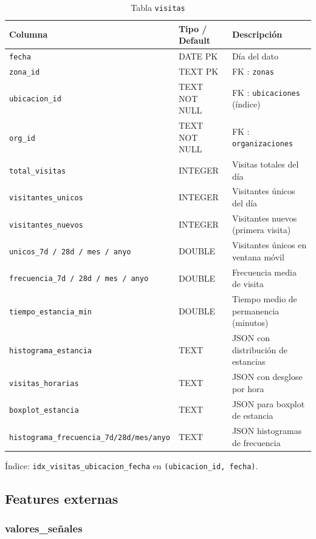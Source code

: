 \documentclass[12pt, a4paper]{article}
\begin{document}
\begin{table}[H]
\centering
\renewcommand{\arraystretch}{1.2}
\begin{tabular}{llp{5.5cm}}
\toprule
\textbf{Columna} & \textbf{Tipo / Default} & \textbf{Descripción} \\
\midrule
\texttt{fecha}                      & DATE PK     & Día del dato \\
\texttt{zona\_id}                   & TEXT PK     & FK : \texttt{zonas} \\
\texttt{ubicacion\_id}              & TEXT NOT NULL & FK : \texttt{ubicaciones} (índice) \\
\texttt{org\_id}                    & TEXT NOT NULL & FK : \texttt{organizaciones} \\
\texttt{total\_visitas}             & INTEGER     & Visitas totales del día \\
\texttt{visitantes\_unicos}         & INTEGER     & Visitantes únicos del día \\
\texttt{visitantes\_nuevos}         & INTEGER     & Visitantes nuevos (primera visita) \\
\texttt{unicos\_7d / 28d / mes / anyo}  & DOUBLE  & Visitantes únicos en ventana móvil \\
\texttt{frecuencia\_7d / 28d / mes / anyo} & DOUBLE & Frecuencia media de visita \\
\texttt{tiempo\_estancia\_min}      & DOUBLE      & Tiempo medio de permanencia (minutos) \\
\texttt{histograma\_estancia}       & TEXT        & JSON con distribución de estancias \\
\texttt{visitas\_horarias}          & TEXT        & JSON con desglose por hora \\
\texttt{boxplot\_estancia}          & TEXT        & JSON para boxplot de estancia \\
\texttt{histograma\_frecuencia\_7d/28d/mes/anyo} & TEXT & JSON histogramas de frecuencia \\
\bottomrule
\end{tabular}
\caption{Tabla \texttt{visitas}}
\end{table}

Índice: \texttt{idx\_visitas\_ubicacion\_fecha} en \texttt{(ubicacion\_id, fecha)}.

\subsection{Features externas}

\subsubsection{valores\_señales}
\end{document}
